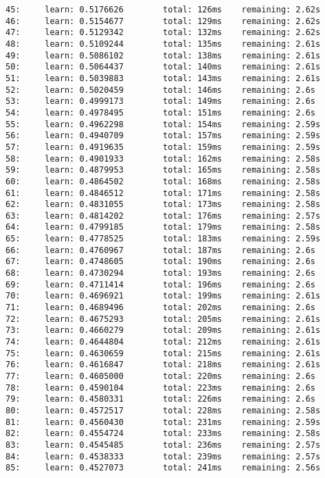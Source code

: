 \documentclass[11pt]{article}
\begin{document}
\begin{Verbatim}[commandchars=\\\{\}]
45:     learn: 0.5176626        total: 126ms    remaining: 2.62s
46:     learn: 0.5154677        total: 129ms    remaining: 2.62s
47:     learn: 0.5129342        total: 132ms    remaining: 2.62s
48:     learn: 0.5109244        total: 135ms    remaining: 2.61s
49:     learn: 0.5086102        total: 138ms    remaining: 2.61s
50:     learn: 0.5064437        total: 140ms    remaining: 2.61s
51:     learn: 0.5039883        total: 143ms    remaining: 2.61s
52:     learn: 0.5020459        total: 146ms    remaining: 2.6s
53:     learn: 0.4999173        total: 149ms    remaining: 2.6s
54:     learn: 0.4978495        total: 151ms    remaining: 2.6s
55:     learn: 0.4962298        total: 154ms    remaining: 2.59s
56:     learn: 0.4940709        total: 157ms    remaining: 2.59s
57:     learn: 0.4919635        total: 159ms    remaining: 2.59s
58:     learn: 0.4901933        total: 162ms    remaining: 2.58s
59:     learn: 0.4879953        total: 165ms    remaining: 2.58s
60:     learn: 0.4864502        total: 168ms    remaining: 2.58s
61:     learn: 0.4846512        total: 171ms    remaining: 2.58s
62:     learn: 0.4831055        total: 173ms    remaining: 2.58s
63:     learn: 0.4814202        total: 176ms    remaining: 2.57s
64:     learn: 0.4799185        total: 179ms    remaining: 2.58s
65:     learn: 0.4778525        total: 183ms    remaining: 2.59s
66:     learn: 0.4760967        total: 187ms    remaining: 2.6s
67:     learn: 0.4748605        total: 190ms    remaining: 2.6s
68:     learn: 0.4730294        total: 193ms    remaining: 2.6s
69:     learn: 0.4711414        total: 196ms    remaining: 2.6s
70:     learn: 0.4696921        total: 199ms    remaining: 2.61s
71:     learn: 0.4689496        total: 202ms    remaining: 2.6s
72:     learn: 0.4675293        total: 205ms    remaining: 2.61s
73:     learn: 0.4660279        total: 209ms    remaining: 2.61s
74:     learn: 0.4644804        total: 212ms    remaining: 2.61s
75:     learn: 0.4630659        total: 215ms    remaining: 2.61s
76:     learn: 0.4616847        total: 218ms    remaining: 2.61s
77:     learn: 0.4605000        total: 220ms    remaining: 2.6s
78:     learn: 0.4590104        total: 223ms    remaining: 2.6s
79:     learn: 0.4580331        total: 226ms    remaining: 2.6s
80:     learn: 0.4572517        total: 228ms    remaining: 2.58s
81:     learn: 0.4560430        total: 231ms    remaining: 2.59s
82:     learn: 0.4554724        total: 233ms    remaining: 2.58s
83:     learn: 0.4545485        total: 236ms    remaining: 2.57s
84:     learn: 0.4538333        total: 239ms    remaining: 2.57s
85:     learn: 0.4527073        total: 241ms    remaining: 2.56s

\end{Verbatim}
\end{document}
